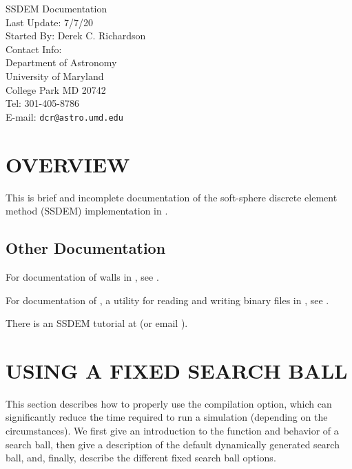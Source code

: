 
\usepackage[hidelinks]{hyperref}



\begin{flushleft}

\huge{SSDEM Documentation}\\
\bigskip\bigskip
\Large{Last Update: 7/7/20}\\
\bigskip\bigskip
\large{Started By: Derek C. Richardson}\\
\bigskip
\large{Contact Info:}\\
Department of Astronomy\\
University of Maryland\\
College Park MD 20742\\
Tel: 301-405-8786\\
E-mail: \texttt{dcr@astro.umd.edu}

\end{flushleft}

\tableofcontents

\section{OVERVIEW}

This is brief and incomplete documentation of the soft-sphere discrete
element method (SSDEM) implementation in \pkd.

\subsection{Other Documentation}

For documentation of walls in \pkd, see .

For documentation of , a utility for reading and writing
binary  files in , see .

There is an SSDEM tutorial at  (or email
).

\section{USING A FIXED SEARCH BALL}

This section describes how to properly use the 
compilation option, which can significantly reduce the time required
to run a simulation (depending on the circumstances). We first give an
introduction to the function and behavior of a search ball, then give
a description of the default dynamically generated search ball, and,
finally, describe the different fixed search ball options.

